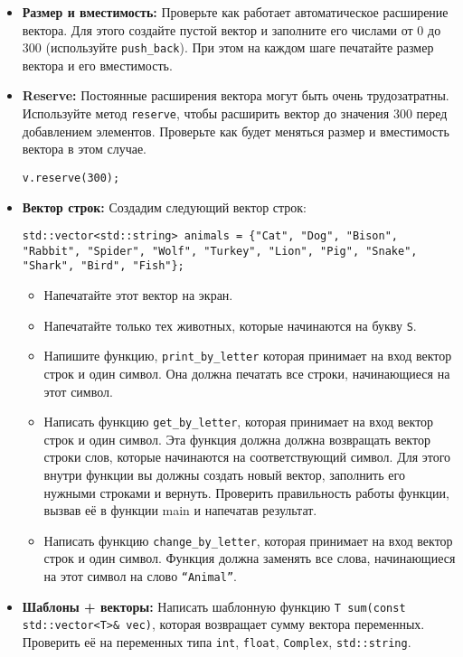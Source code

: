 \documentclass{article}
\begin{document}
      

\begin{itemize}
\item \textbf{Размер и вместимость:} Проверьте как работает автоматическое расширение вектора. Для этого создайте пустой вектор и заполните его числами от 0 до 300 (используйте \texttt{push\_back}). При этом на каждом шаге печатайте размер вектора и его вместимость.
\item \textbf{Reserve:} Постоянные расширения вектора могут быть очень трудозатратны. Используйте метод \texttt{reserve}, чтобы расширить вектор до значения 300 перед добавлением элементов. Проверьте как будет меняться размер и вместимость вектора в этом случае.
\begin{lstlisting}
v.reserve(300);
\end{lstlisting}
\item \textbf{Вектор строк:} Создадим следующий вектор строк:
\begin{lstlisting}
std::vector<std::string> animals = {"Cat", "Dog", "Bison", "Rabbit", "Spider", "Wolf", "Turkey", "Lion", "Pig", "Snake", "Shark", "Bird", "Fish"};
\end{lstlisting}
\begin{itemize}
\item Напечатайте этот вектор на экран.
\item Напечатайте только тех животных, которые начинаются на букву \texttt{S}.
\item Напишите функцию, \texttt{print\_by\_letter} которая принимает на вход вектор строк и один символ. Она должна печатать все строки, начинающиеся на этот символ.
\item Написать функцию \texttt{get\_by\_letter}, которая принимает на вход вектор строк и один символ. Эта функция должна должна возвращать вектор строки слов, которые начинаются на соответствующий символ. Для этого внутри функции вы должны создать новый вектор, заполнить его нужными строками и вернуть. Проверить правильность работы функции, вызвав её в функции main и напечатав результат.
\item Написать функцию \texttt{change\_by\_letter}, которая принимает на вход вектор строк и один символ. Функция должна заменять все слова, начинающиеся на этот символ на слово \texttt{``Animal''}.
\end{itemize}

\item \textbf{Шаблоны + векторы:} Написать шаблонную функцию \texttt{T sum(const std::vector<T>\& vec)}, которая возвращает сумму вектора переменных. Проверить её на переменных типа \texttt{int}, \texttt{float}, \texttt{Complex}, \texttt{std::string}.
\end{itemize}
\end{document}
